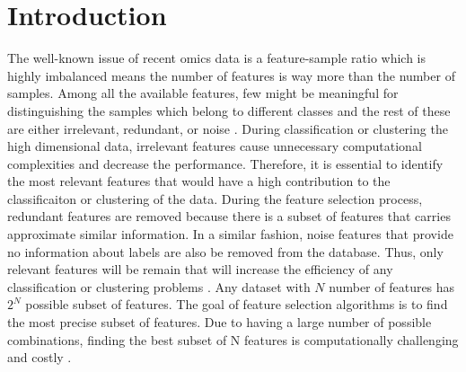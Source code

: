 \documentclass{bioinfo}
\begin{document}
\section{Introduction} \label{intro}
The well-known issue of recent omics data is a feature-sample ratio which is highly imbalanced means the number of features is way more than the number of samples. Among all the available features, few might be meaningful for distinguishing the samples which belong to different classes and the rest of these are either irrelevant, redundant, or noise \citep{pirgazi2019efficient}. During classification or clustering the high dimensional data, irrelevant features cause unnecessary computational complexities and decrease the performance. Therefore, it is essential to identify the most relevant features that would have a high contribution to the classificaiton or clustering of the data. During the feature selection process, redundant features are removed because there is a subset of features that carries approximate similar information. In a similar fashion, noise features that provide no information about labels are also be removed from the database. Thus, only relevant features will be remain that will increase the efficiency of any classification or clustering problems \citep{liu2012feature}. 
Any dataset with $N$ number of features has $2^N$ possible subset of features. The goal of feature selection algorithms is to find the most precise subset of features. Due to having a large number of possible combinations, finding the best subset of N features is computationally challenging and costly \cite{liang2018review}.
\end{document}
